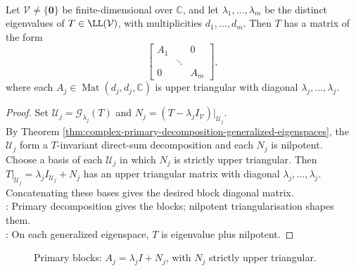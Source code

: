 \begin{theorem} \label{thm:complex-block-diagonal-generalized-eigenbasis} \\
Let $\mathcal{V}\neq\{\mathbf{0}\}$ be finite-dimensional over $\mathbb{C}$, and let $\lambda_1,\ldots,\lambda_m$ be the distinct eigenvalues of $T\in\LL(\mathcal{V})$, with multiplicities $d_1,\ldots,d_m$. Then $T$ has a matrix of the form
\begin{equation*}
\begin{bmatrix}
A_1 & & 0\\
& \ddots & \\
0 & & A_m
\end{bmatrix},
\end{equation*}
where each $A_j\in\operatorname{Mat}(d_j,d_j,\mathbb{C})$ is upper triangular with diagonal $\lambda_j,\ldots,\lambda_j$.
\begin{proof}
Set $\mathcal{U}_j=\mathcal{G}_{\lambda_j}(T)$ and $N_j=(T-\lambda_jI_{\mathcal{V}})|_{\mathcal{U}_j}$.\\
By Theorem \ref{thm:complex-primary-decomposition-generalized-eigenspaces}, the $\mathcal{U}_j$ form a $T$-invariant direct-sum decomposition and each $N_j$ is nilpotent.\\
Choose a basis of each $\mathcal{U}_j$ in which $N_j$ is strictly upper triangular. Then $T|_{\mathcal{U}_j}=\lambda_jI_{\mathcal{U}_j}+N_j$ has an upper triangular matrix with diagonal $\lambda_j,\ldots,\lambda_j$. Concatenating these bases gives the desired block diagonal matrix.\\
: Primary decomposition gives the blocks; nilpotent triangularisation shapes them. \\
: On each generalized eigenspace, $T$ is eigenvalue plus nilpotent.
\end{proof}
\end{theorem}

\begin{figure}[H]
  \centering
  
  \caption{Primary blocks: $A_j=\lambda_jI+N_j$, with $N_j$ strictly upper triangular.}
  \label{fig:primary-block-diagonal-form}
\end{figure}
